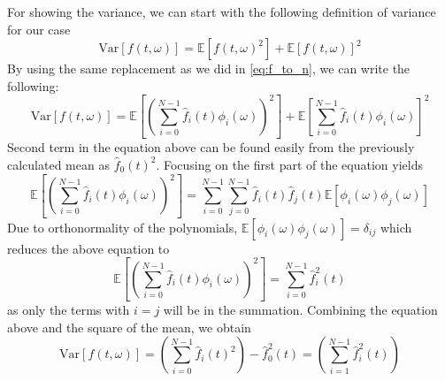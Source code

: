 \documentclass{article}
\begin{document}
For showing the variance, we can start with the following definition of variance for our case
\begin{equation}
    \text{Var}[f(t,\omega)] = \mathbb{E}[f(t, \omega)^2] + \mathbb{E}[f(t,\omega)]^2
\end{equation}
By using the same replacement as we did in \ref*{eq:f_to_n}, we can write the following:
\begin{equation}
    \text{Var}[f(t,\omega)] = \mathbb{E}\left[\left(\sum_{i=0}^{N-1}\hat{f}_i(t)\phi_i(\omega)\right)^2\right] + \mathbb{E}\left[\sum_{i=0}^{N-1}\hat{f}_i(t)\phi_i(\omega)\right]^2
\end{equation}
Second term in the equation above can be found easily from the previously calculated mean as $\hat{f}_0(t)^2$. Focusing
on the first part of the equation yields
\begin{equation}
    \mathbb{E}\left[\left(\sum_{i=0}^{N-1}\hat{f}_i(t)\phi_i(\omega)\right)^2\right] = \sum_{i=0}^{N-1}\sum_{j=0}^{N-1}\hat{f}_i(t)\hat{f}_j(t)\mathbb{E}\left[\phi_i(\omega)\phi_j(\omega)\right]
\end{equation}
Due to orthonormality of the polynomials, $\mathbb{E}\left[\phi_i(\omega)\phi_j(\omega)\right] = \delta_{ij}$ which 
reduces the above equation to
\begin{equation}
    \mathbb{E}\left[\left(\sum_{i=0}^{N-1}\hat{f}_i(t)\phi_i(\omega)\right)^2\right] = \sum_{i=0}^{N-1}\hat{f}_i^2(t)
\end{equation}
as only the terms with $i=j$ will be in the summation. Combining the equation above and the square of the mean, we 
obtain 
\begin{equation}
    \text{Var}[f(t,\omega)] = \left(\sum_{i=0}^{N-1}\hat{f}_i(t)^2\right) - \hat{f}_0^2(t) = \left(\sum_{i=1}^{N-1}\hat{f}_i^2(t)\right)
\end{equation}
\end{document}
